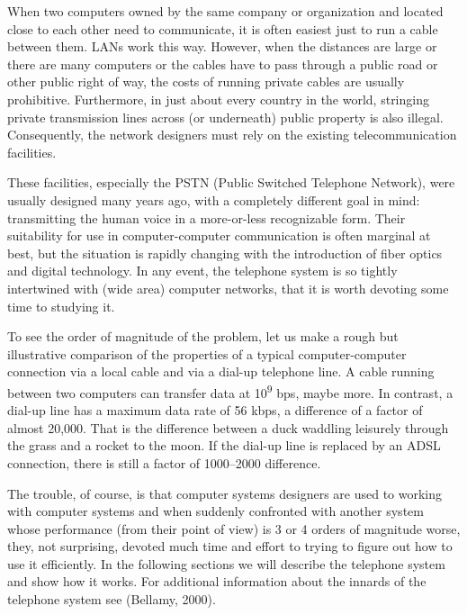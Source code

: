 When two computers owned by the same company or organization and located
close to each other need to communicate, it is often easiest just to run
a cable between them. LANs work this way. However, when the distances
are large or there are many computers or the cables have to pass through
a public road or other public right of way, the costs of running private
cables are usually prohibitive. Furthermore, in just about every country
in the world, stringing private transmission lines across (or
underneath) public property is also illegal. Consequently, the network
designers must rely on the existing telecommunication facilities.

These facilities, especially the {PSTN} ({Public Switched Telephone
Network}), were usually designed many years ago, with a completely
different goal in mind: transmitting the human voice in a more-or-less
recognizable form. Their suitability for use in computer-computer
communication is often marginal at best, but the situation is rapidly
changing with the introduction of fiber optics and digital technology.
In any event, the telephone system is so tightly intertwined with (wide
area) computer networks, that it is worth devoting some time to studying
it.

To see the order of magnitude of the problem, let us make a rough but
illustrative comparison of the properties of a typical computer-computer
connection via a local cable and via a dial-up telephone line. A cable
running between two computers can transfer data at 10\textsuperscript{9}
bps, maybe more. In contrast, a dial-up line has a maximum data rate of
56 kbps, a difference of a factor of almost 20,000. That is the
difference between a duck waddling leisurely through the grass and a
rocket to the moon. If the dial-up line is replaced by an ADSL
connection, there is still a factor of 1000--2000 difference.

The trouble, of course, is that computer systems designers are used to
working with computer systems and when suddenly confronted with another
system whose performance (from their point of view) is 3 or 4 orders of
magnitude worse, they, not surprising, devoted much time and effort to
trying to figure out how to use it efficiently. In the following
sections we will describe the telephone system and show how it works.
For additional information about the innards of the telephone system see
(Bellamy, 2000).

\protect\hypertarget{0130661023_ch02lev1sec5.htmlux5cux23ch02lev2sec17}{}{}


